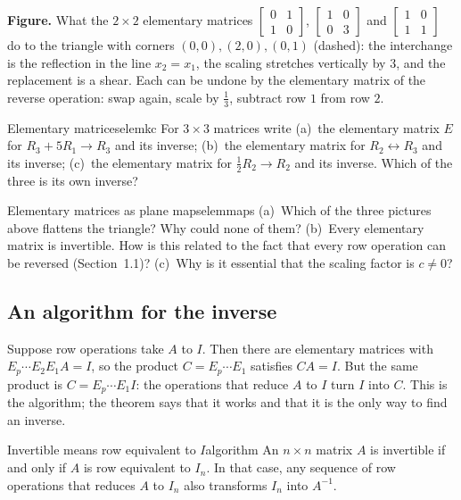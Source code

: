 \documentclass[11pt]{article}
\begin{document}
\textbf{Figure.} What the $2\times2$ elementary matrices $\begin{bmatrix}0&1\\1&0\end{bmatrix}$, $\begin{bmatrix}1&0\\0&3\end{bmatrix}$ and $\begin{bmatrix}1&0\\1&1\end{bmatrix}$ do to the triangle with corners $(0,0),(2,0),(0,1)$ (dashed): the interchange is the reflection in the line $x_2=x_1$, the scaling stretches vertically by $3$, and the replacement is a shear. Each can be undone by the elementary matrix of the reverse operation: swap again, scale by $\tfrac13$, subtract row $1$ from row $2$.

\begin{kc}{Elementary matrices}{elemkc}
For $3\times3$ matrices write (a)~the elementary matrix $E$ for $R_3+5R_1\to R_3$ and its inverse; (b)~the elementary matrix for $R_2\leftrightarrow R_3$ and its inverse; (c)~the elementary matrix for $\tfrac12R_2\to R_2$ and its inverse. Which of the three is its own inverse?
\end{kc}

\begin{think}{Elementary matrices as plane maps}{elemmaps}
(a)~Which of the three pictures above flattens the triangle? Why could none of them? (b)~Every elementary matrix is invertible. How is this related to the fact that every row operation can be reversed (Section~1.1)? (c)~Why is it essential that the scaling factor is $c\neq0$?
\end{think}

\subsection*{An algorithm for the inverse}

Suppose row operations take $A$ to $I$. Then there are elementary matrices with $E_p\cdots E_2E_1A=I$, so the product $C=E_p\cdots E_1$ satisfies $CA=I$. But the same product is $C=E_p\cdots E_1I$: the operations that reduce $A$ to $I$ turn $I$ into $C$. This is the algorithm; the theorem says that it works and that it is the only way to find an inverse.

\begin{thm}{Invertible means row equivalent to $I$}{algorithm}
An $n\times n$ matrix $A$ is invertible if and only if $A$ is row equivalent to $I_n$. In that case, any sequence of row operations that reduces $A$ to $I_n$ also transforms $I_n$ into $A^{-1}$.
\end{thm}
\end{document}
